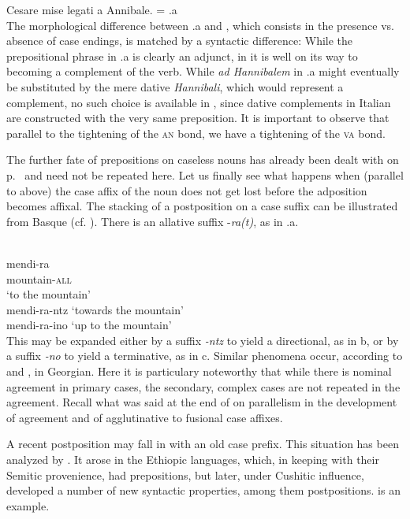 \ea\label{ex:E73}
    Cesare mise legati a Annibale.  = .a\\
\z
\noindent The morphological difference between .a and , which consists in the presence vs. absence of case endings, is matched by a syntactic difference: While the prepositional phrase in .a is clearly an adjunct, in  it is well on its way to becoming a complement of the verb.\label{page100} While \textit{ad Hannibalem} in .a might eventually be substituted by the mere dative \textit{Hannibali}, which would represent a complement, no such choice is available in , since dative complements in Italian are constructed with the very same preposition. It is important to observe that parallel to the tightening of the \textsc{an} bond, we have a tightening of the \textsc{va} bond.

The further fate of prepositions on caseless nouns has already been dealt with on p.~\pageref{page88}\chk%
and need not be repeated here. Let us finally see what happens when (parallel to  above) the case affix of the noun does not get lost before the adposition becomes affixal. The stacking of a postposition on a case suffix can be illustrated from Basque (cf. \citealt[69]{Brettschneider1978}). There is an allative suffix -\textit{ra(t)}, as in .a.

\ea\label{ex:E74}
 \\
\ea
\gll mendi-ra\\
mountain-\textsc{all} \\
\glt ‘to the mountain’\\
\ex  mendi-ra-ntz 
\glt ‘towards the mountain’\\
\ex  mendi-ra-ino 
\glt ‘up to the mountain’\\
\z
\z
\noindent This may be expanded either by a suffix \textit{{}-ntz} to yield a directional, as in b, or by a suffix \textit{{}-no} to yield a terminative, as in c. Similar phenomena occur, according to \citet[123f]{Kahr1976} and \citet[210f]{Comrie1981a},\label{page101} in Georgian. Here it is particulary noteworthy that while there is nominal agreement in primary cases, the secondary, complex cases are not repeated in the agreement. Recall what was said at the end of  on parallelism in the development of agreement and of agglutinative to fusional case affixes.

A recent postposition may fall in with an old case prefix. This situation has been analyzed by \citet{Greenberg1980}. It arose in the Ethiopic languages, which, in keeping with their Semitic provenience, had prepositions, but later, under Cushitic influence, developed a number of new syntactic properties, among them postpositions.  is an example.

